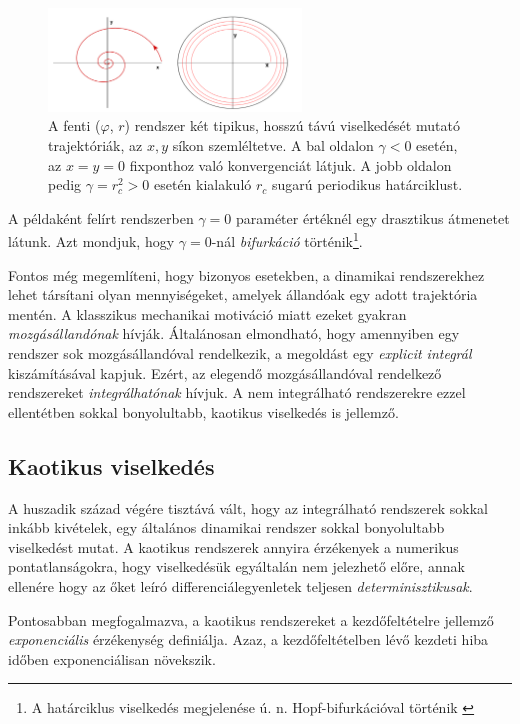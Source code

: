 \documentclass[12pt]{article}
\theoremstyle{plain}
\begin{document}
\begin{figure}[h!]
    \centering
    \includegraphics[width = 0.6\textwidth]{media/rotation.png}
    \caption{A fenti ($\varphi$, $r$) rendszer két tipikus, hosszú távú viselkedését mutató trajektóriák, az $x, y$ síkon szemléltetve. A bal oldalon $\gamma<0$ esetén, az $x=y=0$ fixponthoz való konvergenciát látjuk. A jobb oldalon pedig $\gamma=r_c^2>0$ esetén kialakuló $r_c$ sugarú periodikus határciklust. }
    \label{fig:rot}
\end{figure}
A példaként felírt rendszerben $\gamma=0$ paraméter értéknél egy drasztikus átmenetet látunk. Azt mondjuk, hogy $\gamma = 0$-nál {\em bifurkáció} történik\footnote{A határciklus viselkedés megjelenése ú. n. Hopf-bifurkációval történik \cite{compl}}.

Fontos még megemlíteni, hogy bizonyos esetekben, a dinamikai rendszerekhez lehet társítani olyan mennyiségeket, amelyek állandóak egy adott trajektória mentén. A klasszikus mechanikai motiváció miatt ezeket gyakran {\em mozgásállandónak} hívják. Általánosan elmondható, hogy amennyiben egy rendszer sok mozgásállandóval rendelkezik, a megoldást egy {\em explicit integrál} kiszámításával kapjuk. Ezért, az elegendő mozgásállandóval rendelkező rendszereket {\em integrálhatónak} hívjuk. A nem integrálható rendszerekre ezzel ellentétben sokkal bonyolultabb, kaotikus viselkedés is jellemző. 
\subsection{Kaotikus viselkedés}
A huszadik század végére tisztává vált, hogy az integrálható rendszerek sokkal inkább kivételek, egy általános dinamikai rendszer sokkal bonyolultabb viselkedést mutat. A kaotikus rendszerek annyira érzékenyek a numerikus pontatlanságokra, hogy viselkedésük egyáltalán nem jelezhető előre, annak ellenére hogy az őket leíró differenciálegyenletek teljesen {\em determinisztikusak}.

Pontosabban megfogalmazva, a kaotikus rendszereket a kezdőfeltételre jellemző {\em exponenciális} érzékenység definiálja. Azaz, a kezdőfeltételben lévő kezdeti hiba időben exponenciálisan növekszik. 
\end{document}
